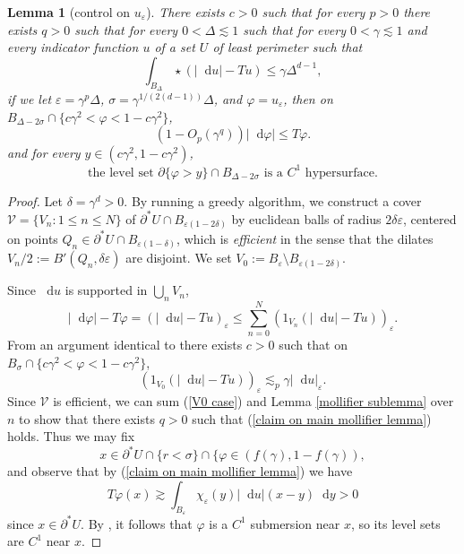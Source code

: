 \documentclass[reqno,12pt,letterpaper]{amsart}
\newcommand*\dif{\mathop{}\!\mathrm{d}}
\newcommand{\dfn}[1]{\emph{#1}\index{#1}}
\newtheorem{lemma}[theorem]{Lemma}
\theoremstyle{definition}
\numberwithin{equation}{section}
\begin{document}
\begin{lemma}[control on $u_\varepsilon$]\label{main mollifier lemma}
There exists $c > 0$ such that for every $p > 0$ there exists $q > 0$ such that for every $0 < \Delta \lesssim 1$ such that for every $0 < \gamma \lesssim 1$ and every indicator function $u$ of a set $U$ of least perimeter such that
\begin{equation}\label{hypothesis on main mollifier lemma}
\int_{B_\Delta} \star (|\dif u| - Tu) \leq \gamma \Delta^{d - 1},
\end{equation}
if we let $\varepsilon = \gamma^p\Delta$, $\sigma = \gamma^{1/(2(d - 1))}\Delta$, and $\varphi = u_\varepsilon$, then on $B_{\Delta - 2\sigma} \cap \{c\gamma^2 < \varphi < 1 - c\gamma^2\}$,
\begin{equation}\label{claim on main mollifier lemma}
(1 - O_p(\gamma^q)) |\dif \varphi| \leq T\varphi.
\end{equation}
and for every $y \in (c\gamma^2, 1 - c\gamma^2)$,
\begin{equation}\label{claim 2 on main mollifier lemma}
\text{the level set } \partial \{\varphi > y\} \cap B_{\Delta - 2\sigma} \text{ is a }C^1\text{ hypersurface}.
\end{equation}
\end{lemma}
\begin{proof}
Let $\delta = \gamma^d > 0$.
By running a greedy algorithm, we construct a cover $\mathcal V = \{V_n: 1 \leq n \leq N\}$ of $\partial^* U \cap B_{\varepsilon(1 - 2\delta)}$ by euclidean balls of radius $2\delta\varepsilon$, centered on points $Q_n \in \partial^* U \cap B_{\varepsilon(1 - \delta)}$, which is \dfn{efficient} in the sense that the dilates $V_n/2 := B'(Q_n, \delta\varepsilon)$ are disjoint.
We set $V_0 := B_\varepsilon \setminus B_{\varepsilon(1 - 2\delta)}$.

Since $\dif u$ is supported in $\bigcup_n V_n$,
$$|\dif \varphi| - T\varphi = (|\dif u| - Tu)_\varepsilon \leq \sum_{n=0}^N (1_{V_n}(|\dif u| - Tu))_\varepsilon.$$
From an argument identical to \cite[pg92]{Giusti77} there exists $c > 0$ such that on $B_\sigma \cap \{c\gamma^2 < \varphi < 1 - c\gamma^2\}$,
\begin{equation}\label{V0 case}
(1_{V_0}(|\dif u| - Tu))_\varepsilon \lesssim_p \gamma |\dif u|_\varepsilon.
\end{equation}
Since $\mathcal V$ is efficient, we can sum (\ref{V0 case}) and Lemma \ref{mollifier sublemma} over $n$ to show that there exists $q > 0$ such that (\ref{claim on main mollifier lemma}) holds. Thus we may fix
$$x \in \partial^* U \cap \{r < \sigma\} \cap \{\varphi \in (f(\gamma), 1 - f(\gamma)),$$
and observe that by (\ref{claim on main mollifier lemma}) we have
$$T\varphi(x) \gtrsim \int_{B_\varepsilon} \chi_\varepsilon(y) |\dif u|(x - y) \dif y > 0$$
since $x \in \partial^* U$.
By \cite[Remark 7.4]{Giusti77}, it follows that $\varphi$ is a $C^1$ submersion near $x$, so its level sets are $C^1$ near $x$.
\end{proof}
\end{document}
